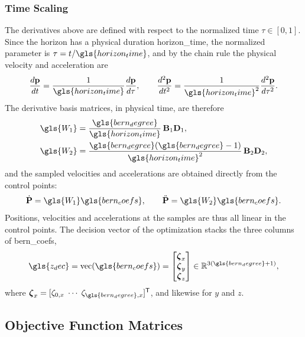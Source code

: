 \subsubsection{Time Scaling}

The derivatives above are defined with respect to the normalized time $\tau\in[0,1]$. Since the horizon has a physical duration \gls{horizon_time}, the normalized parameter is $\tau = t/\gls{horizon_time}$, and by the chain rule the physical velocity and acceleration are
\begin{equation}
    \frac{d\mathbf{p}}{dt}
    =
    \frac{1}{\gls{horizon_time}}\frac{d\mathbf{p}}{d\tau},
    \qquad
    \frac{d^2\mathbf{p}}{dt^2}
    =
    \frac{1}{\gls{horizon_time}^2}\frac{d^2\mathbf{p}}{d\tau^2}.
    \label{eq.6:physical_derivatives}
\end{equation}
The derivative basis matrices, in physical time, are therefore
\begin{align}
    \gls{W_1} &= \frac{\gls{bern_degree}}{\gls{horizon_time}}\,\mathbf{B}_1\mathbf{D}_1,
    \label{eq.6:first_derivative_basis_matrix}\\
    \gls{W_2} &= \frac{\gls{bern_degree}(\gls{bern_degree}-1)}{\gls{horizon_time}^2}\,\mathbf{B}_2\mathbf{D}_2,
    \label{eq.6:second_derivative_basis_matrix}
\end{align}
and the sampled velocities and accelerations are obtained directly from the control points:
\begin{equation}
    \dot{\mathbf{P}} = \gls{W_1} \gls{bern_coefs},
    \qquad
    \ddot{\mathbf{P}} = \gls{W_2} \gls{bern_coefs}.
    \label{eq.6:sampled_derivatives}
\end{equation}
Positions, velocities and accelerations at the samples are thus all linear in the control points. The decision vector of the optimization stacks the three columns of \gls{bern_coefs},
\begin{equation}
    \gls{z_dec}=\operatorname{vec}(\gls{bern_coefs})=\begin{bmatrix}\boldsymbol{\zeta}_{x}\\ \boldsymbol{\zeta}_{y}\\ \boldsymbol{\zeta}_{z}\end{bmatrix}\in\mathbb{R}^{3(\gls{bern_degree}+1)},
\end{equation}
where $\boldsymbol{\zeta}_x=[\zeta_{0,x}\;\cdots\;\zeta_{\gls{bern_degree},x}]^{\mathsf T}$, and likewise for $y$ and $z$.

\subsection{Objective Function Matrices}

